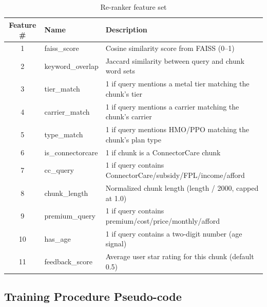 \documentclass[12pt, letterpaper]{article}
\begin{document}
\begin{table}[H]
  \centering
  \caption{Re-ranker feature set}
  \label{tab:features}
  \begin{tabular}{clp{7cm}}
    \toprule
    \textbf{Feature \#} & \textbf{Name} & \textbf{Description} \\
    \midrule
    1  & faiss\_score        & Cosine similarity score from FAISS (0--1) \\
    2  & keyword\_overlap    & Jaccard similarity between query and chunk word sets \\
    3  & tier\_match         & 1 if query mentions a metal tier matching the chunk's tier \\
    4  & carrier\_match      & 1 if query mentions a carrier matching the chunk's carrier \\
    5  & type\_match         & 1 if query mentions HMO/PPO matching the chunk's plan type \\
    6  & is\_connectorcare   & 1 if chunk is a ConnectorCare chunk \\
    7  & cc\_query           & 1 if query contains ConnectorCare/subsidy/FPL/income/afford \\
    8  & chunk\_length       & Normalized chunk length (length / 2000, capped at 1.0) \\
    9  & premium\_query      & 1 if query contains premium/cost/price/monthly/afford \\
    10 & has\_age            & 1 if query contains a two-digit number (age signal) \\
    11 & feedback\_score     & Average user star rating for this chunk (default 0.5) \\
    \bottomrule
  \end{tabular}
\end{table}

\subsection{Training Procedure Pseudo-code}
\end{document}

